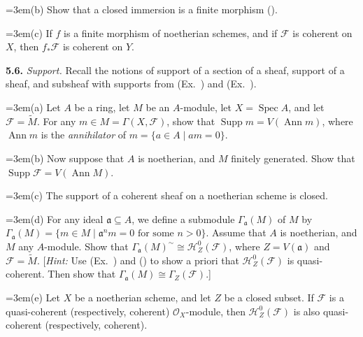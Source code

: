 {\noindent\hangindent=3em\hspace*{1.7em}(b) Show that a closed immersion is a finite morphism ().

\noindent\hangindent=3em\hspace*{1.7em}(c) If $f$ is a finite morphism of noetherian schemes, and if $\mathcal F$ is coherent on $X$, then $f_*\mathcal F$ is coherent on $Y$.

\smallskip
\noindent\hypertarget{ex-II-5.6}{}\textbf{5.6.} \emph{Support.} Recall the notions of support of a section of a sheaf, support of a sheaf, and subsheaf with supports from (Ex.~) and (Ex.~).

\noindent\hangindent=3em\hspace*{1.7em}(a) Let $A$ be a ring, let $M$ be an $A$-module, let $X=\operatorname{Spec} A$, and let $\mathcal F=\widetilde M$. For any $m\in M=\Gamma(X,\mathcal F)$, show that $\operatorname{Supp} m=V(\operatorname{Ann}m)$, where $\operatorname{Ann}m$ is the \emph{annihilator} of $m=\{a\in A\mid am=0\}$.

\noindent\hangindent=3em\hspace*{1.7em}(b) Now suppose that $A$ is noetherian, and $M$ finitely generated. Show that $\operatorname{Supp}\mathcal F=V(\operatorname{Ann} M)$.

\noindent\hangindent=3em\hspace*{1.7em}(c) The support of a coherent sheaf on a noetherian scheme is closed.

\noindent\hangindent=3em\hspace*{1.7em}(d) For any ideal $\mathfrak a\subseteq A$, we define a submodule $\Gamma_{\mathfrak a}(M)$ of $M$ by $\Gamma_{\mathfrak a}(M)=\{m\in M\mid\mathfrak a^nm=0\text{ for some }n>0\}$. Assume that $A$ is noetherian, and $M$ any $A$-module. Show that $\Gamma_{\mathfrak a}(M)^\sim\cong\mathcal H_Z^0(\mathcal F)$, where $Z=V(\mathfrak a)$ and $\mathcal F=\widetilde M$. [\emph{Hint:} Use (Ex.~) and () to show a priori that $\mathcal H_Z^0(\mathcal F)$ is quasi-coherent. Then show that $\Gamma_{\mathfrak a}(M)\cong\Gamma_Z(\mathcal F)$.]

\noindent\hangindent=3em\hspace*{1.7em}(e) Let $X$ be a noetherian scheme, and let $Z$ be a closed subset. If $\mathcal F$ is a quasi-coherent (respectively, coherent) $\mathcal O_X$-module, then $\mathcal H_Z^0(\mathcal F)$ is also quasi-coherent (respectively, coherent).

}
